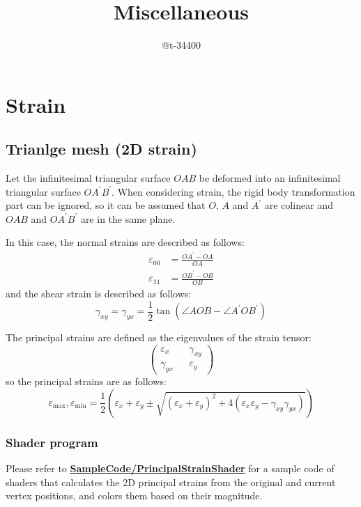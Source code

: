 \documentclass[]{article}
\title{Miscellaneous}
\author{@t-34400}
\theoremstyle{definition}
\begin{document}
\maketitle
\tableofcontents

\section{Strain}
\subsection{Trianlge mesh (2D strain)}
Let the infinitesimal triangular surface $OAB$ be deformed into an infinitesimal triangular surface $OA^\prime B^\prime$. When considering strain, the rigid body transformation part can be ignored, so it can be assumed that $O$, $A$ and $A^\prime$ are colinear and $OAB$ and $OA^\prime B^\prime$ are in the same plane. 

In this case, the normal strains are described as follows:
\begin{equation}
    \begin{aligned}
        \varepsilon_{00} &= \frac{OA^\prime - OA}{OA}\\
        \varepsilon_{11} &= \frac{OB^\prime - OB}{OB}
    \end{aligned}
\end{equation}
and the shear strain is described as follows:
\begin{equation}
    \gamma_{xy} = \gamma_{yx} = \frac{1}{2}\tan\left(\angle AOB - \angle A^\prime OB^\prime\right)    
\end{equation}

The principal strains are defined as the eigenvalues of the strain tensor:
\begin{equation}
    \begin{pmatrix}
        \varepsilon_x && \gamma_{xy} \\
        \gamma_{yx} && \varepsilon_y
    \end{pmatrix}        
\end{equation}
so the principal strains are as follows:
\begin{equation}
    \varepsilon_{\mathrm{max}}, \varepsilon_{\mathrm{min}} = \frac{1}{2}\left(\varepsilon_x + \varepsilon_y \pm \sqrt{(\varepsilon_x + \varepsilon_y)^2 + 4(\varepsilon_x\varepsilon_y-\gamma_{xy}\gamma_{yx})}\right)    
\end{equation}

\subsubsection{Shader program}
Please refer to \href{https://github.com/t-34400/PhysicsAndMathematics/SampleCode/PrincipalStrainShader}{\textbf{SampleCode/PrincipalStrainShader}} for a sample code of shaders that calculates the 2D principal strains from the original and current vertex positions, and colors them based on their magnitude.
\end{document}
